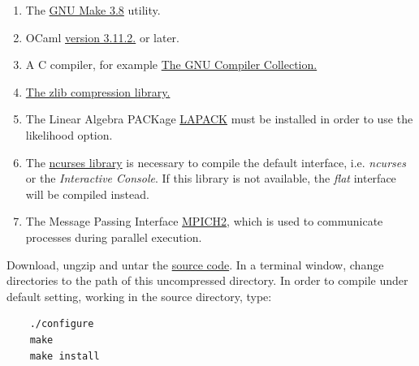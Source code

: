 \begin{enumerate}
    \item The \href{http://www.gnu.org/software/make/}{GNU Make 3.8} utility. 
    \item OCaml \href{http://www.ocaml.org}{version 3.11.2.} or later. 
    \item A C compiler, for example \href{http://gcc.gnu.org/} {The GNU Compiler Collection.}
    \item \href{http://www.zlib.net}{The zlib compression library.}
    \item The Linear Algebra PACKage \href {http://www.netlib.org/lapack/}{LAPACK} must be installed in order to 
    use the likelihood option.
    \item The \href{http://www.gnu.org/s/ncurses} {ncurses library} is necessary to compile the default interface, 
    i.e. \emph{ncurses} or the \emph{Interactive Console}. If this library is not available, the \emph{flat} interface will be 
    compiled instead.
   \item The Message Passing Interface \href{http://www-unix.mcs.anl.gov/mpi/}{MPICH2}, which is used to communicate 
   processes during parallel execution.
\end{enumerate}
Download, ungzip and untar the \href{http://research.amnh.org/scicomp/projects/poy.php}{\poy source code}.  
In a terminal window, change directories to the path of this uncompressed directory.  
In order to compile under default setting, working in the source directory, type:
\begin{verbatim}
	./configure
	make
	make install
\end{verbatim}


